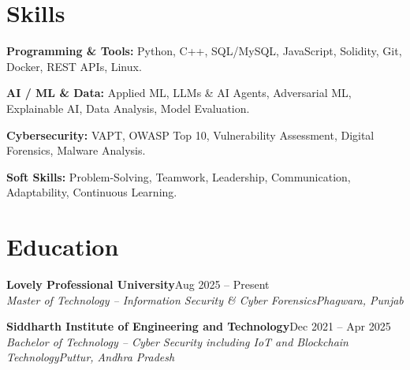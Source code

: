 \documentclass[a4paper,10pt]{article}
\begin{document}
\section*{Skills}
\textbf{Programming \& Tools:} Python, C++, SQL/MySQL, JavaScript, Solidity, Git, Docker, REST APIs, Linux.\par\vspace{2pt}
\textbf{AI / ML \& Data:} Applied ML, LLMs \& AI Agents, Adversarial ML, Explainable AI, Data Analysis, Model Evaluation.\par\vspace{2pt}
\textbf{Cybersecurity:} VAPT, OWASP Top 10, Vulnerability Assessment, Digital Forensics, Malware Analysis.\par\vspace{2pt}
\textbf{Soft Skills:} Problem-Solving, Teamwork, Leadership, Communication, Adaptability, Continuous Learning.

\section*{Education}
\textbf{Lovely Professional University}\hfill Aug 2025 -- Present\\
{\itshape Master of Technology -- Information Security \& Cyber Forensics}\hfill{\itshape Phagwara, Punjab}\par\vspace{2pt}
\textbf{Siddharth Institute of Engineering and Technology}\hfill Dec 2021 -- Apr 2025\\
{\itshape Bachelor of Technology -- Cyber Security including IoT and Blockchain Technology}\hfill{\itshape Puttur, Andhra Pradesh}\par
\end{document}

